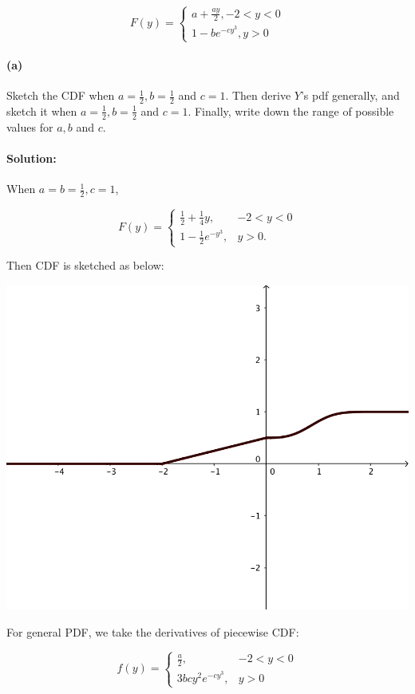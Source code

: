 \documentclass[a4paper, 11pt, twoside]{article}
\begin{document}
\[F(y)=
\begin{cases}
	a + \frac{ay}{2}, -2 < y < 0\\
	1-be^{-cy^3}, y > 0
\end{cases}
\]

\paragraph{(a)} Sketch the CDF when $a=\frac{1}{2}, b=\frac{1}{2}$ and $c=1$. Then derive $Y$'s pdf generally, and sketch it when $a=\frac{1}{2}, b=\frac{1}{2}$ and $c=1$. Finally, write down the range of possible values for $a,b$ and $c$.

\paragraph{Solution:} When $a=b=\frac12, c=1$,

\[F(y)=\begin{cases}\frac12 + \frac14y, &-2<y<0\\ 1-\frac12 e^{-y^3}, &y>0.\end{cases}\]

Then CDF is sketched as below:

\includegraphics{image/2a-cdf}

For general PDF, we take the derivatives of piecewise CDF:

\[f(y)=\begin{cases}
	\frac{a}{2}, &-2<y<0\\
	3bcy^2e^{-cy^3}, &y>0
\end{cases}\]
\end{document}
